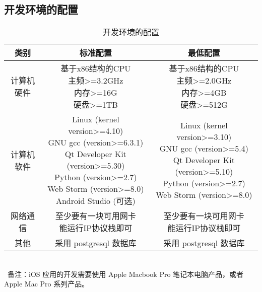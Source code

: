 \subsection{开发环境的配置}
\begin{table}[h]
\centering
\caption{开发环境的配置} \label{tab:development-environment}
\begin{tabular}{|c|c|c|}
    \hline
    类别 & 标准配置 & 最低配置 \\
    \hline
    计算机硬件 & \tabincell{c}{基于x86结构的CPU\\ 主频>=3.2GHz\\ 内存>=16G\\ 硬盘>=1TB} & \tabincell{c}{基于x86结构的CPU\\ 主频>=2.0GHz\\ 内存>=4GB\\ 硬盘>=512G} \\
    \hline
    计算机软件 & 
    \tabincell{c} {
        Linux (kernel version>=4.10)\\ 
        GNU gcc (version>=6.3.1)\\
        Qt Developer Kit (version>=5.30)\\
        Python (version>=2.7)\\
        Web Storm (version>=8.0)\\
        Android Studio (可选)\\
        } & 
    \tabincell{c} {
        Linux (kernel version>=3.10)\\ 
        GNU gcc (version>=5.4)\\
        Qt Developer Kit (version>=5.10)\\
        Python (version>=2.7)\\
        Web Storm (version>=8.0)\\
        } \\
    \hline
    网络通信 & \tabincell{c}{至少要有一块可用网卡\\ 能运行IP协议栈即可} & \tabincell{c}{至少要有一块可用网卡\\ 能运行IP协议栈即可} \\
    \hline
    其他 & 采用 postgresql 数据库 & 采用 postgresql 数据库 \\
    \hline
\end{tabular}
~\\~备注：iOS 应用的开发需要使用 Apple Macbook Pro 
笔记本电脑产品，或者 Apple Mac Pro 系列产品。
\end{table}

\newpage
